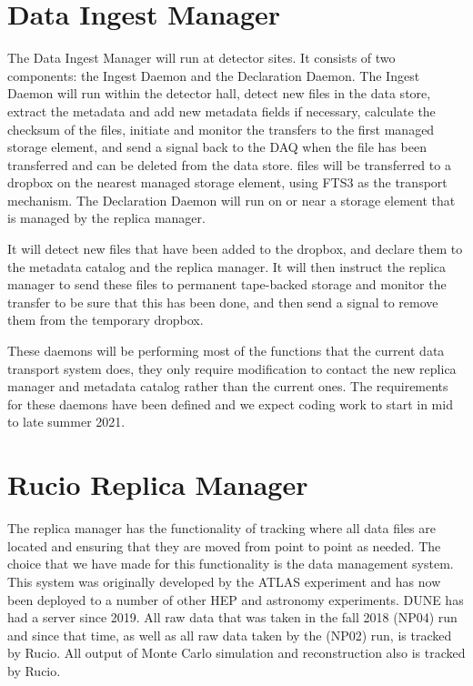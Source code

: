 \documentclass[../main-v1.tex]{subfiles}
\begin{document}
\section{Data Ingest Manager }

The Data Ingest Manager will run at detector sites.  It consists of two components:  the Ingest Daemon and the Declaration Daemon.  The Ingest Daemon will 
run within the detector hall, detect new files in the data store, extract the metadata and add new metadata fields
if necessary, calculate the checksum of the files, initiate and monitor the transfers to the first managed 
storage element, and send a signal back to the DAQ when the file has been transferred and can be deleted from the data store.
files will be transferred to a dropbox on the nearest managed storage element, using FTS3  as the transport mechanism.  
The Declaration Daemon will run on or near a storage element that is managed by the replica manager. 

It will detect new files that have been added to the dropbox, and declare them to the metadata catalog and the replica manager.  It will then instruct the replica manager to send these files to permanent tape-backed storage and monitor the transfer to be sure that this has been done, and then send a signal to remove them from the temporary dropbox.

These daemons will be performing most of the functions that the current data transport system does, they only 
require modification to contact the new replica manager and metadata catalog rather than the current ones.  The 
requirements for these daemons have been defined   and we expect coding work to start in mid to late summer 2021.

\section{Rucio Replica Manager }

The replica manager has the functionality of tracking where all data files are located and ensuring that they 
are moved from point to point as needed.  The choice that we have made for this functionality is the  data
management system\cite{Baritsis:2019csbs}.  This system was originally developed by the ATLAS experiment and has now been deployed to 
a number of other HEP and astronomy experiments.  DUNE has had a  server since 2019.  All raw data that was
taken in the fall 2018  (NP04) run and since that time, as well as all raw data taken by the  (NP02) run, is tracked by Rucio.  All output of Monte Carlo simulation and reconstruction also is tracked by Rucio. 
\end{document}

